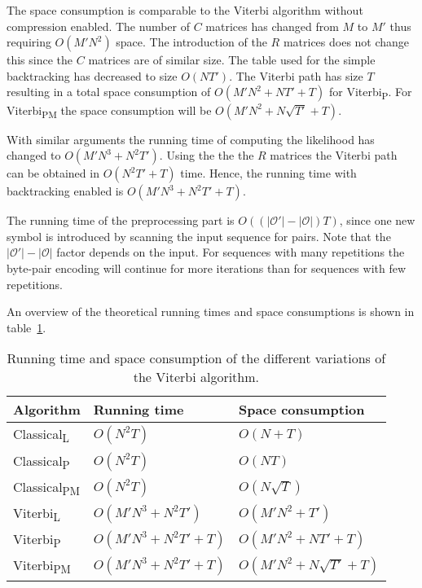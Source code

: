 The space consumption is comparable to the Viterbi algorithm without
compression enabled. The number of $C$ matrices has changed from $M$ to $M'$
thus requiring $O(M' N^2)$ space. The introduction of the $R$ matrices does not
change this since the $C$ matrices are of similar size. The table used for the
simple backtracking has decreased to size $O(N T')$. The Viterbi path has size
$T$ resulting in a total space consumption of $O(M' N^2 + N T' + T)$ for
Viterbi\textsubscript{P}. For Viterbi\textsubscript{PM} the space consumption will be
$O(M' N^2 + N \sqrt{T'} + T)$.

With similar arguments the running time of computing the likelihood has changed
to $O(M' N^3 +N^2 T')$. Using the the the $R$ matrices the Viterbi path can be
obtained in $O(N^2 T' + T)$ time. Hence, the running time with backtracking
enabled is $O(M' N^3 +N^2 T' + T)$.

The running time of the preprocessing part is $O(
\left(
  \lvert\mathcal{O'}\rvert - \lvert{\mathcal{O}}\rvert
\right) T)$, since one new symbol is introduced by scanning the input sequence for
pairs. Note that the $\lvert\mathcal{O'}\rvert - \lvert{\mathcal{O}}\rvert$
factor depends on the input. For sequences with many repetitions the byte-pair
encoding will continue for more iterations than for sequences with few
repetitions.

An overview of the theoretical running times and space consumptions is shown in
table~\ref{tab:running-time}.

\begin{table}
  \centering
  \caption{Running time and space consumption of the different variations of the
    Viterbi algorithm.}
  \label{tab:running-time}
  \begin{tabular}{lll}
    \toprule
    Algorithm                   & Running time             & Space consumption             \\
    \midrule
    Classical\textsubscript{L}  & $O(N^2 T)$               & $O(N + T)$                    \\
    Classical\textsubscript{P}  & $O(N^2 T)$               & $O(NT)$                       \\
    Classical\textsubscript{PM} & $O(N^2 T)$               & $O(N\sqrt{T})$                \\
    Viterbi\textsubscript{L}    & $O(M' N^3 + N^2 T')$     & $O(M' N^2 + T')$              \\
    Viterbi\textsubscript{P}    & $O(M' N^3 + N^2 T' + T)$ & $O(M' N^2 + N T' + T)$        \\
    Viterbi\textsubscript{PM}   & $O(M' N^3 + N^2 T' + T)$ & $O(M' N^2 + N \sqrt{T'} + T)$ \\
    \bottomrule
  \end{tabular}
\end{table}

